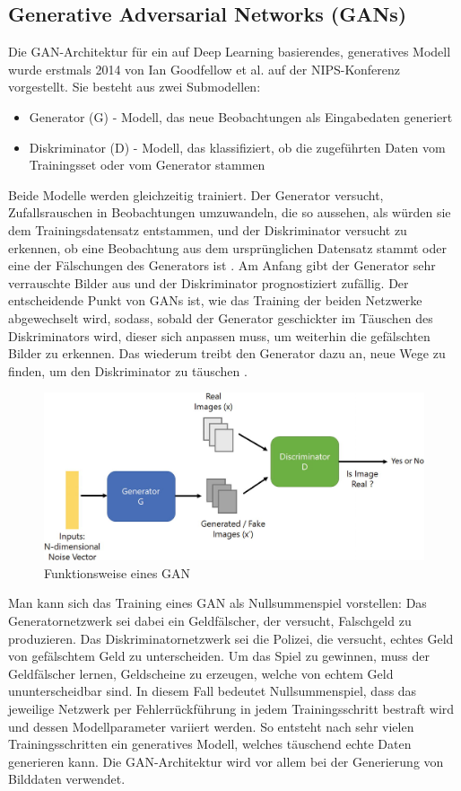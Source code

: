 \subsection{Generative Adversarial Networks (GANs)}\label{Generative Adversarial Networks (GANs)}

Die GAN-Architektur für ein auf Deep Learning basierendes, generatives Modell wurde erstmals 2014 von Ian Goodfellow et al. auf der NIPS-Konferenz vorgestellt. Sie besteht aus zwei Submodellen:
\begin{itemize}
    \item Generator (G) - Modell, das neue Beobachtungen als Eingabedaten generiert
    \item Diskriminator (D) - Modell, das klassifiziert, ob die zugeführten Daten vom Trainingsset oder vom Generator stammen
\end{itemize}
Beide Modelle werden gleichzeitig trainiert. Der Generator versucht, Zufallsrauschen in Beobachtungen umzuwandeln, die so aussehen, als würden sie dem Trainingsdatensatz entstammen, und der Diskriminator versucht zu erkennen, ob eine Beobachtung aus dem ursprünglichen Datensatz stammt oder eine der Fälschungen des Generators ist \cite{bro19}. Am Anfang gibt der Generator sehr verrauschte Bilder aus und der Diskriminator prognostiziert zufällig. Der entscheidende Punkt von GANs ist, wie das Training der beiden Netzwerke abgewechselt wird, sodass, sobald der Generator geschickter im Täuschen des Diskriminators wird, dieser sich anpassen muss, um weiterhin die gefälschten Bilder zu erkennen. Das wiederum treibt den Generator dazu an, neue Wege zu finden, um den Diskriminator zu täuschen \cite[S.99]{fos19}.
\begin{figure}[H]
    \centering
    \includegraphics[width=1\textwidth,angle=0]{abb/Springer_GAN}
    \caption[Funktionsweise eines GAN]{Funktionsweise eines GAN \cite{SDT18}}
\end{figure}
Man kann sich das Training eines GAN als Nullsummenspiel vorstellen: Das Generatornetzwerk sei dabei ein Geldfälscher, der versucht, Falschgeld zu produzieren. Das Diskriminatornetzwerk sei die Polizei, die versucht, echtes Geld von gefälschtem Geld zu unterscheiden. Um das Spiel zu gewinnen, muss der Geldfälscher lernen, Geldscheine zu erzeugen, welche von echtem Geld ununterscheidbar sind\cite{goo16}. In diesem Fall bedeutet Nullsummenspiel, dass das jeweilige Netzwerk per Fehlerrückführung in jedem Trainingsschritt bestraft wird und dessen Modellparameter variiert werden. So entsteht nach sehr vielen Trainingsschritten ein generatives Modell, welches täuschend echte Daten generieren kann. Die GAN-Architektur wird vor allem bei der Generierung von Bilddaten verwendet.

